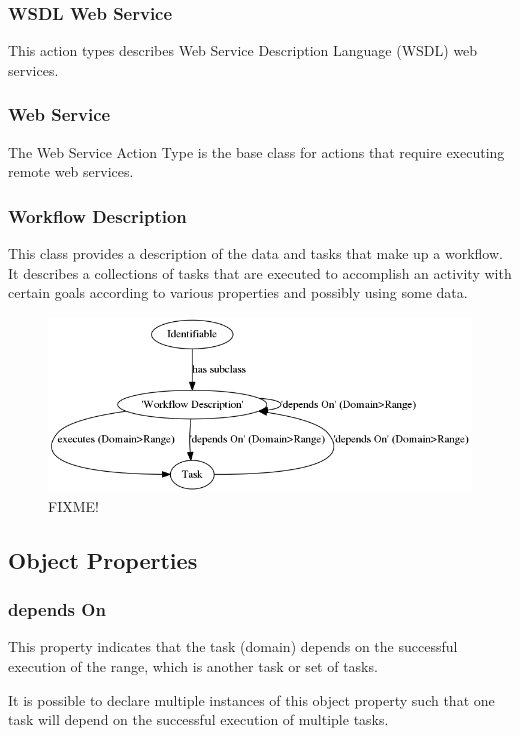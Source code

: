 			\subsubsection{
			WSDL Web Service
			}
			This action types describes Web Service Description Language (WSDL) web services.
			\subsubsection{
			Web Service
			}
			The Web Service Action Type is the base class for actions that require executing remote web services.
\subsubsection{Workflow Description}

This class provides a description of the data and tasks that make up a
workflow. It describes a collections of tasks that are executed to accomplish
an activity with certain goals according to various properties and possibly
using some data.

\begin{figure}[htbp]
\centering
\includegraphics[width=\textwidth]{figures/workflowDescription.png}
\caption{FIXME!}
\label{workflow-description}
\end{figure}


\subsection{Object Properties}
			\subsubsection{
			depends On
			}
			This property indicates that the task (domain) depends on the successful execution of the range, which is another task or set of tasks.

It is possible to declare multiple instances of this object property such that one task will depend on the successful execution of multiple tasks.
